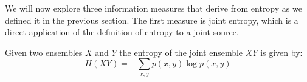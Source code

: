 %
%

We will now explore three information measures that derive from entropy as we defined it in the previous section. The first measure is joint entropy, which is a direct application of the definition of entropy to a joint source.
\begin{definition}
Given two ensembles ${X}$ and ${Y}$ the entropy of the joint ensemble $XY$ is given by:
\begin{equation}
H({XY}) = - \sum_{x,y} p(x,y)\log p(x,y)
\end{equation}
\end{definition}

